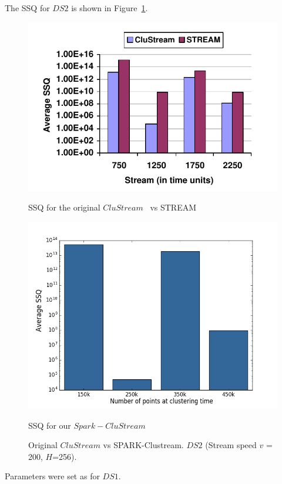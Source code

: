 The SSQ for $DS2$ is shown in Figure~\ref{fig:DS2quality}.
    \begin{figure}[!ht]
        \begin{minipage}[l]{1.0\columnwidth}
            \centering
             \includegraphics[width=0.9\columnwidth]{./styles/200h256-orig.png}
            \caption{SSQ for the original $CluStream$~\cite{clustreamOrig} vs STREAM~\cite{}}\label{fig:200h256-orig}
        \end{minipage}
        \hfill{}
        \begin{minipage}[r]{1.0\columnwidth}
            \centering
            \includegraphics[width=0.9\columnwidth]{./styles/200h256.png}
            \caption{SSQ for our $Spark-CluStream$}\label{fig:200h256}
        \end{minipage}
        \captionsetup{labelformat=empty}
        \caption{Original $CluStream$ vs SPARK-Clustream. $DS2$ (Stream speed $v$ = 200, $H$=256).}
        \label{fig:DS2quality}
    \end{figure}
Parameters were set as for $DS1$.

